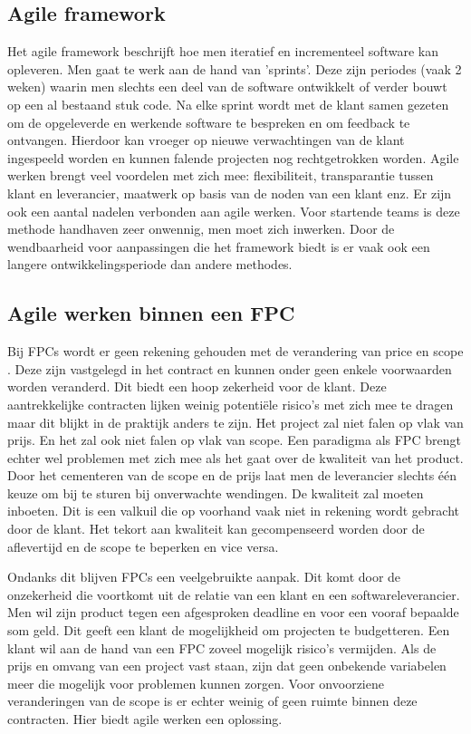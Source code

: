 \documentclass{hogent-article}
\begin{document}
    \subsection{Agile framework}
    Het agile framework beschrijft hoe men iteratief en incrementeel software kan opleveren. Men gaat te werk aan de hand van 'sprints'. Deze zijn periodes (vaak 2 weken) waarin men slechts een deel van de software ontwikkelt of verder bouwt op een al bestaand stuk code. Na elke sprint wordt met de klant samen gezeten om de opgeleverde en werkende software te bespreken en om feedback te ontvangen. Hierdoor kan vroeger op nieuwe verwachtingen van de klant ingespeeld worden en kunnen falende projecten nog rechtgetrokken worden.
    Agile werken brengt veel voordelen met zich mee: flexibiliteit, transparantie tussen klant en leverancier, maatwerk op basis van de noden van een klant enz. Er zijn ook een aantal nadelen verbonden aan agile werken. Voor startende teams is deze methode handhaven zeer onwennig, men moet zich inwerken. Door de wendbaarheid voor aanpassingen die het framework biedt is er vaak ook een langere ontwikkelingsperiode dan andere methodes.
    
    \subsection{Agile werken binnen een FPC}
	Bij FPCs wordt er geen rekening gehouden met de verandering van price en scope \autocite{SCRUM2012}. Deze zijn vastgelegd in het contract en kunnen onder geen enkele voorwaarden worden veranderd. Dit biedt een hoop zekerheid voor de klant. Deze aantrekkelijke contracten lijken weinig potentiële risico's met zich mee te dragen maar dit blijkt in de praktijk anders te zijn. Het project zal niet falen op vlak van prijs. En het zal ook niet falen op vlak van scope. Een paradigma als FPC brengt echter wel problemen met zich mee als het gaat over de kwaliteit van het product. Door het cementeren van de scope en de prijs laat men de leverancier slechts één keuze om bij te sturen bij onverwachte wendingen. De kwaliteit zal moeten inboeten. Dit is een valkuil die op voorhand vaak niet in rekening wordt gebracht door de klant. Het tekort aan kwaliteit kan gecompenseerd worden door de aflevertijd en de scope te beperken en vice versa.
    
    Ondanks dit blijven FPCs een veelgebruikte aanpak. Dit komt door de onzekerheid die voortkomt uit de relatie van een klant en een softwareleverancier. Men wil zijn product tegen een afgesproken deadline en voor een vooraf bepaalde som geld. Dit geeft een klant de mogelijkheid om projecten te budgetteren.  Een klant wil aan de hand van een FPC zoveel mogelijk risico's vermijden. Als de prijs en omvang van een project vast staan, zijn dat geen onbekende variabelen meer die mogelijk voor problemen kunnen zorgen. Voor onvoorziene veranderingen van de scope is er echter weinig of geen ruimte binnen deze contracten. Hier biedt agile werken een oplossing.
    
\end{document}
